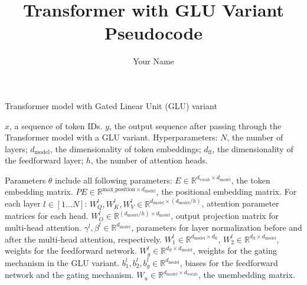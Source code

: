 \documentclass{article}
\title{Transformer with GLU Variant Pseudocode}
\author{Your Name}
\begin{document}
\maketitle

\begin{algorithm}
\caption{Transformer model with Gated Linear Unit (GLU) variant}
\begin{algorithmic}[1]

\Require $x$, a sequence of token IDs.
\Ensure $y$, the output sequence after passing through the Transformer model with a GLU variant.
\State Hyperparameters: $N$, the number of layers; $d_{\text{model}}$, the dimensionality of token embeddings; $d_{\text{ff}}$, the dimensionality of the feedforward layer; $h$, the number of attention heads.

\State Parameters $\theta$ include all following parameters:
\State \hspace{\algorithmicindent} $E \in \mathbb{R}^{d_{\text{vocab}} \times d_{\text{model}}}$, the token embedding matrix.
\State \hspace{\algorithmicindent} $PE \in \mathbb{R}^{\text{max\_position} \times d_{\text{model}}}$, the positional embedding matrix.
\State \hspace{\algorithmicindent} For each layer $l \in [1...N]$:
\State \hspace{\algorithmicindent}\hspace{\algorithmicindent} $W_Q^l, W_K^l, W_V^l \in \mathbb{R}^{d_{\text{model}} \times (d_{\text{model}}/h)}$, attention parameter matrices for each head.
\State \hspace{\algorithmicindent}\hspace{\algorithmicindent} $W_O^l \in \mathbb{R}^{(d_{\text{model}}/h) \times d_{\text{model}}}$, output projection matrix for multi-head attention.
\State \hspace{\algorithmicindent}\hspace{\algorithmicindent} $\gamma^l, \beta^l \in \mathbb{R}^{d_{\text{model}}}$, parameters for layer normalization before and after the multi-head attention, respectively.
\State \hspace{\algorithmicindent}\hspace{\algorithmicindent} $W_1^l \in \mathbb{R}^{d_{\text{model}} \times d_{\text{ff}}}$, $W_2^l \in \mathbb{R}^{d_{\text{ff}} \times d_{\text{model}}}$, weights for the feedforward network.
\State \hspace{\algorithmicindent}\hspace{\algorithmicindent} $W_g^l \in \mathbb{R}^{d_{\text{ff}} \times d_{\text{model}}}$, weights for the gating mechanism in the GLU variant.
\State \hspace{\algorithmicindent}\hspace{\algorithmicindent} $b_1^l, b_2^l, b_g^l \in \mathbb{R}^{d_{\text{model}}}$, biases for the feedforward network and the gating mechanism.
\State \hspace{\algorithmicindent} $W_u \in \mathbb{R}^{d_{\text{model}} \times d_{\text{vocab}}}$, the unembedding matrix.


\end{algorithmic}
\end{algorithm}
\end{document}

